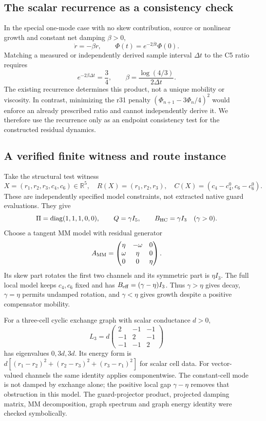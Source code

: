 \documentclass[11pt,a4paper]{article}
\begin{document}
\subsection{The scalar recurrence as a consistency check}
In the special one-mode case with no skew contribution, source or nonlinear
growth and constant net damping $\beta>0$,
\[
\dot r=-\beta r,\qquad
\Phi(t)=e^{-2\beta t}\Phi(0).
\]
Matching a measured or independently derived sample interval $\Delta t$
to the C5 ratio requires
\[
e^{-2\beta\Delta t}=\frac34,
\qquad \beta=\frac{\log(4/3)}{2\Delta t}.
\]
The existing recurrence determines this product, not a unique mobility or
viscosity. In contrast, minimizing the r31 penalty
$(\Phi_{n+1}-3\Phi_n/4)^2$ would enforce an already prescribed ratio and
cannot independently derive it. We therefore use the recurrence only as
an endpoint consistency test for the constructed residual dynamics.

\subsection{A verified finite witness and route instance}
Take the structural test witness
\[
X=(r_1,r_2,r_3,c_4,c_6)\in\mathbb R^5,
\quad R(X)=(r_1,r_2,r_3),
\quad C(X)=(c_4-c_4^0,c_6-c_6^0).
\]
These are independently specified model constraints, not extracted native
guard evaluations. They give
\[
\Pi=\operatorname{diag}(1,1,1,0,0),\qquad Q=\gamma I_5,
\qquad B_{\rm HC}=\gamma I_3\quad(\gamma>0).
\]
Choose a tangent MM model with residual generator
\[
A_{\rm MM}=
\begin{pmatrix}\eta&-\omega&0\\\omega&\eta&0\\0&0&\eta\end{pmatrix}.
\]
Its skew part rotates the first two channels and its symmetric part is
$\eta I_3$. The full local model keeps $c_4,c_6$ fixed and has
$B_{\rm eff}=(\gamma-\eta)I_3$. Thus $\gamma>\eta$ gives decay,
$\gamma=\eta$ permits undamped rotation, and $\gamma<\eta$ gives growth
despite a positive compensator mobility.

For a three-cell cyclic exchange graph with scalar conductance $d>0$,
\[
L_3=d\begin{pmatrix}2&-1&-1\\-1&2&-1\\-1&-1&2\end{pmatrix}
\]
has eigenvalues $0,3d,3d$. Its energy form is
$d[(r_1-r_2)^2+(r_2-r_3)^2+(r_3-r_1)^2]$ for scalar cell data.
For vector-valued channels the same identity applies componentwise.
The constant-cell mode is not damped by exchange alone; the positive local
gap $\gamma-\eta$ removes that obstruction in this model.
The guard-projector product, projected damping matrix, MM decomposition,
graph spectrum and graph energy identity were checked symbolically.
\end{document}
